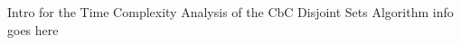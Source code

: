 \documentclass[../../ClusteringConnectionsMAIN.tex]{subfiles}
\begin{document}
\begin{flushleft}
\begin{large}

Intro for the Time Complexity Analysis of the CbC Disjoint Sets Algorithm info goes here


\end{large}
\end{flushleft}
\end{document}
